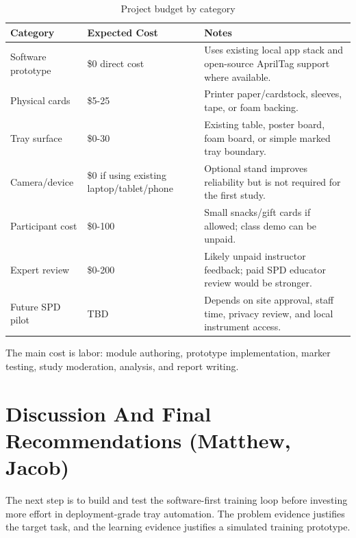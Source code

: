 \documentclass[10pt,a4paper]{article}
\begin{document}
\begin{table}[H]
\centering
\caption{Project budget by category}
\label{tab:project-budget-by-category}
\small\renewcommand{\arraystretch}{1.2}\setlength{\tabcolsep}{4pt}
\begin{tabularx}{\textwidth}{|>{\raggedright\arraybackslash}X|>{\raggedright\arraybackslash}X|>{\raggedright\arraybackslash}X|}
\hline
Category & Expected Cost & Notes \\
\hline
Software prototype & \$0 direct cost & Uses existing local app stack and open-source AprilTag support where available. \\
\hline
Physical cards & \$5-25 & Printer paper/cardstock, sleeves, tape, or foam backing. \\
\hline
Tray surface & \$0-30 & Existing table, poster board, foam board, or simple marked tray boundary. \\
\hline
Camera/device & \$0 if using existing laptop/tablet/phone & Optional stand improves reliability but is not required for the first study. \\
\hline
Participant cost & \$0-100 & Small snacks/gift cards if allowed; class demo can be unpaid. \\
\hline
Expert review & \$0-200 & Likely unpaid instructor feedback; paid SPD educator review would be stronger. \\
\hline
Future SPD pilot & TBD & Depends on site approval, staff time, privacy review, and local instrument access. \\
\hline
\end{tabularx}
\end{table}
The main cost is labor: module authoring, prototype implementation, marker
testing, study moderation, analysis, and report writing.






\section{Discussion And Final Recommendations \hfill {\normalfont\small (Matthew, Jacob)}}
\label{sec:discussion-and-final-recommendations}

The next step is to build and test the software-first training
loop before investing more effort in deployment-grade tray automation. The
problem evidence justifies the target task, and the learning
evidence justifies a simulated training prototype.
\end{document}
